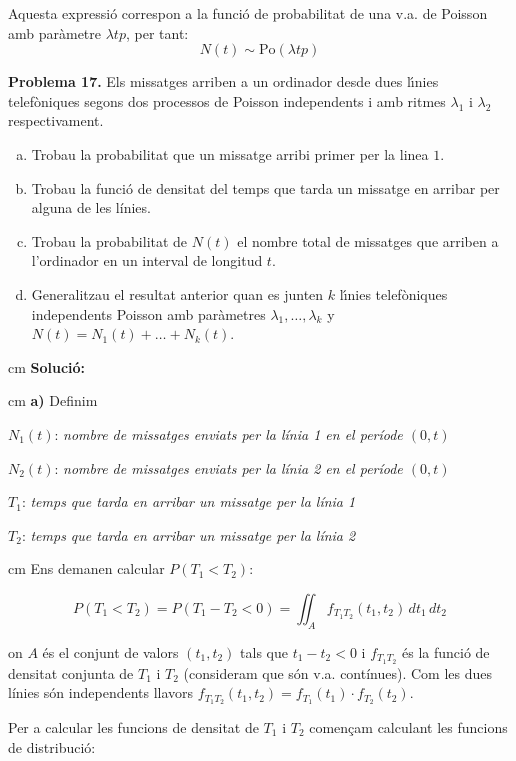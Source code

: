\documentclass{article}
\begin{document}
Aquesta expressi\'o correspon a la funci\'o de probabilitat de una v.a. de 
Poisson amb par\`ametre $\lambda t p$, per tant: 
\[
N(t) \sim \mathrm{Po}(\lambda t p)
\]


\newpage

\noindent
\textbf{Problema 17.}
Els missatges arriben a un ordinador desde dues l\'{\i}nies
telef\`oniques segons dos processos de Poisson independents i amb
ritmes $\lambda_{1}$ i $\lambda_{2}$ respectivament.
\begin{enumerate}[a)]
    \item Trobau la probabilitat  que un missatge arribi primer per la
    linea $1$.
    \item  Trobau la funci\'o de densitat del temps que tarda un
    missatge en arribar per alguna de les l\'inies.
    \item Trobau la probabilitat de $N(t)$ el nombre total de
    missatges
    que arriben a l'ordinador en un interval de longitud $t$.
    \item  Generalitzau el resultat anterior quan es junten $k$
    l\'{\i}nies telef\`oniques independents Poisson amb par\`ametres
$\lambda_{1},\ldots,\lambda_{k}$ y
$N(t)=N_{1}(t)+\ldots+N_{k}(t)$.
\end{enumerate}

 cm
\noindent
\textbf{Soluci\'o:}

 cm
\noindent
\textbf{a)} Definim

$N_1(t)$: \textit{nombre de missatges enviats per la l\'inia 1 en el per\'iode $(0, t)$}

$N_2(t)$: \textit{nombre de missatges enviats per la l\'inia 2 en el per\'iode $(0, t)$}

$T_1$: \textit{temps que tarda en arribar un missatge per la l\'inia 1}

$T_2$: \textit{temps que tarda en arribar un missatge per la l\'inia 2}

 cm
Ens demanen calcular $P(T_1 < T_2)$:

\[
P(T_1 < T_2)=P(T_1 - T_2 < 0)=\iint_A f_{T_1 T_2}(t_1, t_2) \, dt_1 \, dt_2
\]

\noindent
on $A$ \'es el conjunt de valors $(t_1, t_2)$ tals que $t_1-t_2 < 0$ i $f_{T_1 T_2}$ \'es
la funci\'o de densitat conjunta de $T_1$ i $T_2$ (consideram que s\'on v.a. cont\'inues). 
Com les dues l\'inies s\'on independents
llavors $f_{T_1 T_2}(t_1, t_2)=f_{T_1}(t_1) \cdot f_{T_2}(t_2)$.

Per a calcular les funcions de densitat 
de $T_1$ i $T_2$ comen\c{c}am calculant les funcions de distribuci\'o:
\end{document}
